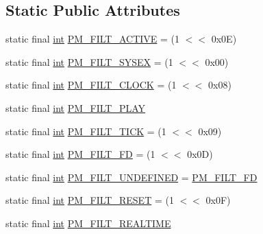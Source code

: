\subsection*{Static Public Attributes}
\begin{DoxyCompactItemize}
\item 
static final \hyperlink{xmltok_8h_a5a0d4a5641ce434f1d23533f2b2e6653}{int} \hyperlink{classjportmidi_1_1_j_port_midi_api_a06288ff48f23e061825247d016e9ecac}{P\+M\+\_\+\+F\+I\+L\+T\+\_\+\+A\+C\+T\+I\+VE} = (1 $<$$<$ 0x0\+E)
\item 
static final \hyperlink{xmltok_8h_a5a0d4a5641ce434f1d23533f2b2e6653}{int} \hyperlink{classjportmidi_1_1_j_port_midi_api_ae5e2de89685b28ce28dcb76d00319154}{P\+M\+\_\+\+F\+I\+L\+T\+\_\+\+S\+Y\+S\+EX} = (1 $<$$<$ 0x00)
\item 
static final \hyperlink{xmltok_8h_a5a0d4a5641ce434f1d23533f2b2e6653}{int} \hyperlink{classjportmidi_1_1_j_port_midi_api_ac6eb56f5baf43702f5f0d165e24fa78c}{P\+M\+\_\+\+F\+I\+L\+T\+\_\+\+C\+L\+O\+CK} = (1 $<$$<$ 0x08)
\item 
static final \hyperlink{xmltok_8h_a5a0d4a5641ce434f1d23533f2b2e6653}{int} \hyperlink{classjportmidi_1_1_j_port_midi_api_a8168fe5d421f630a47fc79419a2514f8}{P\+M\+\_\+\+F\+I\+L\+T\+\_\+\+P\+L\+AY}
\item 
static final \hyperlink{xmltok_8h_a5a0d4a5641ce434f1d23533f2b2e6653}{int} \hyperlink{classjportmidi_1_1_j_port_midi_api_a1371a1b8f29785a4a5b8c3a112854ef5}{P\+M\+\_\+\+F\+I\+L\+T\+\_\+\+T\+I\+CK} = (1 $<$$<$ 0x09)
\item 
static final \hyperlink{xmltok_8h_a5a0d4a5641ce434f1d23533f2b2e6653}{int} \hyperlink{classjportmidi_1_1_j_port_midi_api_a5647429b30ab0cbe965d639f3a24529e}{P\+M\+\_\+\+F\+I\+L\+T\+\_\+\+FD} = (1 $<$$<$ 0x0\+D)
\item 
static final \hyperlink{xmltok_8h_a5a0d4a5641ce434f1d23533f2b2e6653}{int} \hyperlink{classjportmidi_1_1_j_port_midi_api_aeed1df9b880f96c4df4daae1be6f678b}{P\+M\+\_\+\+F\+I\+L\+T\+\_\+\+U\+N\+D\+E\+F\+I\+N\+ED} = \hyperlink{classjportmidi_1_1_j_port_midi_api_a5647429b30ab0cbe965d639f3a24529e}{P\+M\+\_\+\+F\+I\+L\+T\+\_\+\+FD}
\item 
static final \hyperlink{xmltok_8h_a5a0d4a5641ce434f1d23533f2b2e6653}{int} \hyperlink{classjportmidi_1_1_j_port_midi_api_adf4947e98496b463c6f3c5773b28bc00}{P\+M\+\_\+\+F\+I\+L\+T\+\_\+\+R\+E\+S\+ET} = (1 $<$$<$ 0x0\+F)
\item 
static final \hyperlink{xmltok_8h_a5a0d4a5641ce434f1d23533f2b2e6653}{int} \hyperlink{classjportmidi_1_1_j_port_midi_api_af5443c23efcc8005cbed5c5de69991ab}{P\+M\+\_\+\+F\+I\+L\+T\+\_\+\+R\+E\+A\+L\+T\+I\+ME}

\end{DoxyCompactItemize}
